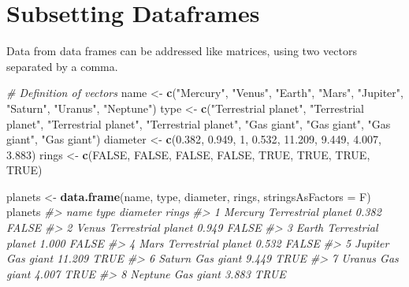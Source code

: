 \documentclass[]{book}
\newenvironment{Shaded}{\begin{snugshade}}{\end{snugshade}}
\newcommand{\KeywordTok}[1]{\textcolor[rgb]{0.13,0.29,0.53}{\textbf{#1}}}
\newcommand{\DataTypeTok}[1]{\textcolor[rgb]{0.13,0.29,0.53}{#1}}
\newcommand{\DecValTok}[1]{\textcolor[rgb]{0.00,0.00,0.81}{#1}}
\newcommand{\FloatTok}[1]{\textcolor[rgb]{0.00,0.00,0.81}{#1}}
\newcommand{\StringTok}[1]{\textcolor[rgb]{0.31,0.60,0.02}{#1}}
\newcommand{\CommentTok}[1]{\textcolor[rgb]{0.56,0.35,0.01}{\textit{#1}}}
\newcommand{\OtherTok}[1]{\textcolor[rgb]{0.56,0.35,0.01}{#1}}
\newcommand{\NormalTok}[1]{#1}
\begin{document}
\section{Subsetting Dataframes}\label{subsetting-dataframes}

Data from data frames can be addressed like matrices, using two vectors
separated by a comma.

\begin{Shaded}
\begin{Highlighting}[]
\CommentTok{# Definition of vectors}
\NormalTok{name <-}\StringTok{ }\KeywordTok{c}\NormalTok{(}\StringTok{"Mercury"}\NormalTok{, }\StringTok{"Venus"}\NormalTok{, }\StringTok{"Earth"}\NormalTok{, }\StringTok{"Mars"}\NormalTok{, }\StringTok{"Jupiter"}\NormalTok{, }\StringTok{"Saturn"}\NormalTok{, }\StringTok{"Uranus"}\NormalTok{, }\StringTok{"Neptune"}\NormalTok{)}
\NormalTok{type <-}\StringTok{ }\KeywordTok{c}\NormalTok{(}\StringTok{"Terrestrial planet"}\NormalTok{, }\StringTok{"Terrestrial planet"}\NormalTok{, }\StringTok{"Terrestrial planet"}\NormalTok{, }\StringTok{"Terrestrial planet"}\NormalTok{, }\StringTok{"Gas giant"}\NormalTok{, }\StringTok{"Gas giant"}\NormalTok{, }\StringTok{"Gas giant"}\NormalTok{, }\StringTok{"Gas giant"}\NormalTok{)}
\NormalTok{diameter <-}\StringTok{ }\KeywordTok{c}\NormalTok{(}\FloatTok{0.382}\NormalTok{, }\FloatTok{0.949}\NormalTok{, }\DecValTok{1}\NormalTok{, }\FloatTok{0.532}\NormalTok{, }\FloatTok{11.209}\NormalTok{, }\FloatTok{9.449}\NormalTok{, }\FloatTok{4.007}\NormalTok{, }\FloatTok{3.883}\NormalTok{)}
\NormalTok{rings <-}\StringTok{ }\KeywordTok{c}\NormalTok{(}\OtherTok{FALSE}\NormalTok{, }\OtherTok{FALSE}\NormalTok{, }\OtherTok{FALSE}\NormalTok{, }\OtherTok{FALSE}\NormalTok{, }\OtherTok{TRUE}\NormalTok{, }\OtherTok{TRUE}\NormalTok{, }\OtherTok{TRUE}\NormalTok{, }\OtherTok{TRUE}\NormalTok{)}

\NormalTok{planets <-}\StringTok{ }\KeywordTok{data.frame}\NormalTok{(name, type, diameter, rings, }\DataTypeTok{stringsAsFactors =}\NormalTok{ F)}
\NormalTok{planets}
\CommentTok{#>      name               type diameter rings}
\CommentTok{#> 1 Mercury Terrestrial planet    0.382 FALSE}
\CommentTok{#> 2   Venus Terrestrial planet    0.949 FALSE}
\CommentTok{#> 3   Earth Terrestrial planet    1.000 FALSE}
\CommentTok{#> 4    Mars Terrestrial planet    0.532 FALSE}
\CommentTok{#> 5 Jupiter          Gas giant   11.209  TRUE}
\CommentTok{#> 6  Saturn          Gas giant    9.449  TRUE}
\CommentTok{#> 7  Uranus          Gas giant    4.007  TRUE}
\CommentTok{#> 8 Neptune          Gas giant    3.883  TRUE}
\end{Highlighting}
\end{Shaded}
\end{document}
